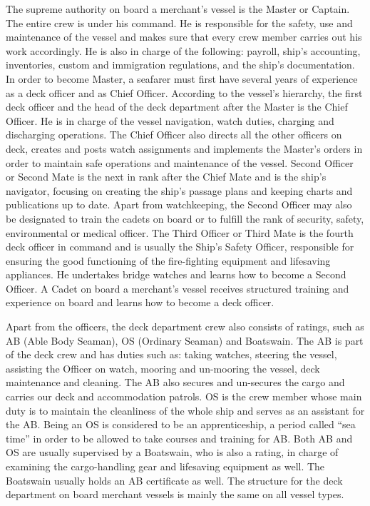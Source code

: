 The supreme authority on board a merchant's vessel is the Master or Captain. The entire crew is under his command. He is responsible for the safety, use and maintenance of the vessel and makes sure that every crew member carries out his work accordingly. He is also in charge of the following: payroll, ship’s accounting, inventories, custom and immigration regulations, and the ship’s documentation. In order to become Master, a seafarer must first have several years of experience as a deck officer and as Chief Officer.
According to the vessel’s hierarchy, the first deck officer and the head of the deck department after the Master is the Chief Officer. He is in charge of the vessel navigation, watch duties, charging and discharging operations. The Chief Officer also directs all the other officers on deck, creates and posts watch assignments and implements the Master’s orders in order to maintain safe operations and maintenance of the vessel.
Second Officer or Second Mate is the next in rank after the Chief Mate and is the ship’s navigator, focusing on creating the ship’s passage plans and keeping charts and publications up to date. Apart from watchkeeping, the Second Officer may also be designated to train the cadets on board or to fulfill the rank of security, safety, environmental or medical officer.
The Third Officer or Third Mate is the fourth deck officer in command and is usually the Ship’s Safety Officer, responsible for ensuring the good functioning of the fire-fighting equipment and lifesaving appliances. He undertakes bridge watches and learns how to become a Second Officer.
A Cadet on board a merchant's vessel receives structured training and experience on board and learns how to become a deck officer.

Apart from the officers, the deck department crew also consists of ratings, such as AB (Able Body Seaman), OS (Ordinary Seaman) and Boatswain.
The AB is part of the deck crew and has duties such as: taking watches, steering the vessel, assisting the Officer on watch, mooring and un-mooring the vessel, deck maintenance and cleaning. The AB also secures and un-secures the cargo and carries our deck and accommodation patrols.
OS is the crew member whose main duty is to maintain the cleanliness of the whole ship and serves as an assistant for the AB. Being an OS is considered to be an apprenticeship, a period called “sea time” in order to be allowed to take courses and training for AB.
Both AB and OS are usually supervised by a Boatswain, who is also a rating, in charge of examining the cargo-handling gear and lifesaving equipment as well. The Boatswain usually holds an AB certificate as well.
The structure for the deck department on board merchant vessels is mainly the same on all vessel types. \cite{Nedcon2013}

